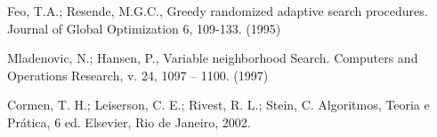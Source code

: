 \documentclass[12pt]{article}
\begin{document}
\begin{thebibliography}{99}
		
	Feo, T.A.; Resende, M.G.C., Greedy randomized adaptive search procedures. Journal of Global Optimization 6, 109-133. (1995)

	
	Mladenovic, N.; Hansen, P., Variable neighborhood Search. Computers and Operations Research, v. 24, 1097 – 1100. (1997)
	
	
	Cormen, T. H.; Leiserson, C. E.; Rivest, R. L.; Stein, C. Algoritmos, Teoria e Prática, 6 ed. Elsevier, Rio de Janeiro, 2002.

	
\end{thebibliography}


  
\end{document}

